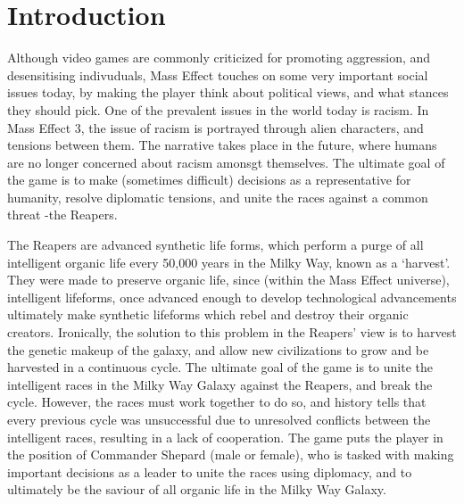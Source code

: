 \documentclass[journal]{IEEEtran}
\begin{document}
\section{Introduction}
Although video games are commonly criticized for promoting aggression, and desensitising indivuduals, Mass Effect touches on some very important %
social issues today, by making the player think about political views,
and what stances they should pick. One of the prevalent issues in the world today is racism. In Mass Effect 3, the issue of racism is portrayed through alien characters, and tensions between them. The narrative takes place in the future, where humans are no longer concerned about racism amonsgt themselves. The ultimate goal of the game is to make (sometimes difficult) decisions as a representative for humanity, resolve diplomatic tensions, and unite the races against a common threat -the Reapers.

The Reapers are advanced synthetic life forms, which perform a purge of all intelligent organic life every 50,000 years in the Milky Way,
known as a `harvest'. They were made to preserve organic life, since
(within the Mass Effect universe), intelligent lifeforms, once advanced
enough to develop technological advancements ultimately make synthetic
lifeforms which rebel and destroy their organic creators. Ironically,
the solution to this problem in the Reapers' view is to harvest the genetic makeup of the galaxy, and allow new civilizations to grow and be harvested in a continuous cycle. The ultimate goal of the game is to unite the intelligent
races in the Milky Way Galaxy against the Reapers, and break the cycle.
However, the races must work together to do so,
and history tells that every previous cycle was
unsuccessful due to unresolved conflicts between the intelligent races, resulting in a lack of cooperation. The game puts the player in the position of Commander Shepard (male or female), who is tasked with making important decisions as a leader to unite the races using diplomacy, and to ultimately be the saviour of all organic life in the Milky Way Galaxy.
\end{document}
